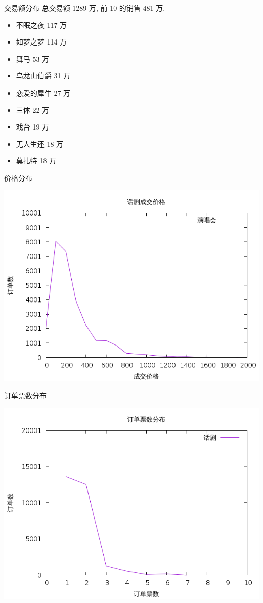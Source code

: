 \documentclass[presentation, bigger]{beamer}
\begin{document}
\begin{frame}[label={sec:org9b28387}]{交易额分布}
总交易额 1289 万, 前 10 的销售 481 万.
\begin{itemize}
\item 不眠之夜 117 万
\item 如梦之梦 114 万
\item 舞马 53 万
\item 乌龙山伯爵 31 万
\item 恋爱的犀牛 27 万
\item 三体 22 万
\item 戏台 19 万
\item 无人生还 18 万
\item 莫扎特 18 万
\end{itemize}
\end{frame}
\begin{frame}[label={sec:orgc2051d9}]{价格分布}
\begin{center}
\includegraphics[width=.9\linewidth]{./image/drama-price-distribution.png}
\end{center}
\end{frame}

\begin{frame}[label={sec:org1761638}]{订单票数分布}
\begin{center}
\includegraphics[width=.9\linewidth]{./image/drama-tickets-distribution.png}
\end{center}
\end{frame}
\end{document}
